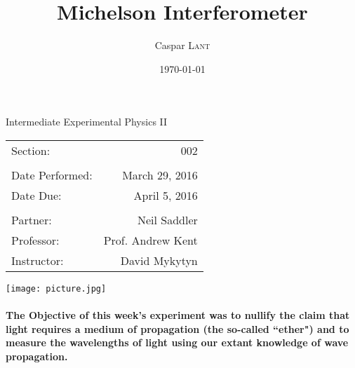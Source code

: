 \documentclass{amsart}
\title{Michelson Interferometer}
\author{Caspar \textsc{Lant}} %
\date{\today} %
\begin{document}
\bigskip

\maketitle %
\begin{center}
    Intermediate Experimental Physics II\\
    \vspace{.7cm}
    \begin{tabular}{l r}
        Section: & 002\\
        \\
        Date Performed: & March 29, 2016 \\ %
        Date Due: & April 5, 2016\\
        \\
        Partner: & Neil Saddler\\ %
        Professor: & Prof. Andrew Kent\\
        Instructor: & David Mykytyn %
    \end{tabular}
    \vfill
    \texttt{[image: picture.jpg]}
    \vfill
\end{center}

\pagebreak
{}
\paragraph{\textbf{The Objective} of this week's experiment was to nullify the claim that light requires a medium of propagation (the so-called ``ether") and to measure the wavelengths of light using our extant knowledge of wave propagation.}
\end{document}
